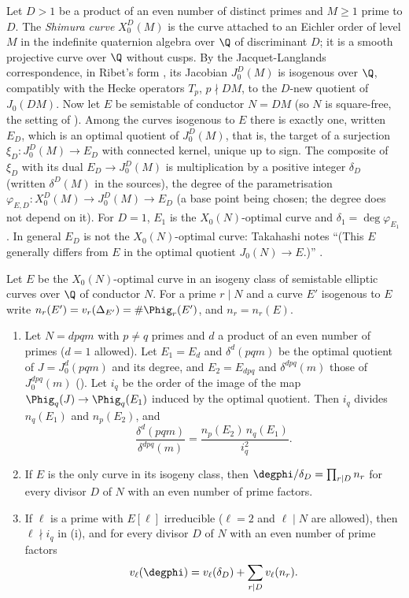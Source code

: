 \begin{definition}\label{def:moddeg:shimura-curve}
Let $D>1$ be a product of an even number of distinct primes and $M\ge1$ prime to $D$. The \emph{Shimura curve} $X_0^D(M)$ is the curve attached to an Eichler order of level $M$ in the indefinite
quaternion algebra over $\Q$ of discriminant $D$; it is a smooth projective curve over $\Q$ without cusps. By the Jacquet-Langlands correspondence, in Ribet's form \cite{Ribet90}, its Jacobian
$J_0^D(M)$ is isogenous over $\Q$, compatibly with the Hecke operators $T_p$, $p\nmid DM$, to the $D$-new quotient of $J_0(DM)$. Now let $E$ be semistable of conductor $N=DM$ (so $N$ is
square-free, the setting of \cite{RibetTakahashi97,Takahashi01}). Among the curves isogenous to $E$ there is exactly one, written $E_D$, which is an optimal quotient of $J_0^D(M)$, that is, the
target of a surjection $\xi_D\colon J_0^D(M)\to E_D$ with connected kernel, unique up to sign. The composite of $\xi_D$ with its dual $E_D\to J_0^D(M)$ is multiplication by a positive
integer $\delta_D$ (written $\delta^D(M)$ in the sources), the degree of the parametrisation $\varphi_{E,D}\colon X_0^D(M)\to J_0^D(M)\to E_D$ (a base point being chosen; the degree does not
depend on it). For $D=1$, $E_1$ is the $X_0(N)$-optimal curve and $\delta_1=\deg\varphi_{E_1}$. In general $E_D$ is not the $X_0(N)$-optimal curve: Takahashi notes ``(This $E$ generally differs
from $E$ in the optimal quotient $J_0(N)\to E$.)'' \cite[p.~75]{Takahashi01}.
\end{definition}

\begin{theorem}\label{thm:moddeg:ribet-takahashi}
Let $E$ be the $X_0(N)$-optimal curve in an isogeny class of semistable elliptic curves over $\Q$ of conductor $N$. For a prime $r\mid N$ and a curve $E'$ isogenous to $E$ write
$n_r(E')=v_r(\Delta_{E'})=\#\Phig_r(E')$, and $n_r=n_r(E)$.
\begin{enumerate}[label=(\roman*)]
\item Let $N=dpqm$ with $p\ne q$ primes and $d$ a product of an even number of primes ($d=1$ allowed). Let $E_1=E_d$ and $\delta^d(pqm)$ be the optimal quotient of $J=J_0^d(pqm)$ and its degree,
and $E_2=E_{dpq}$ and $\delta^{dpq}(m)$ those of $J_0^{dpq}(m)$ (). Let $i_q$ be the order of the image of the map $\Phig_q(J)\to\Phig_q(E_1)$ induced by the optimal
quotient. Then $i_q$ divides $n_q(E_1)$ and $n_p(E_2)$, and
\[
\frac{\delta^d(pqm)}{\delta^{dpq}(m)}=\frac{n_p(E_2)\,n_q(E_1)}{i_q^{2}}.
\]
\item If $E$ is the only curve in its isogeny class, then $\degphi/\delta_D=\prod_{r\mid D}n_r$ for every divisor $D$ of $N$ with an even number of prime factors.
\item If $\ell$ is a prime with $E[\ell]$ irreducible ($\ell=2$ and $\ell\mid N$ are allowed), then $\ell\nmid i_q$ in (i), and for every divisor $D$ of $N$ with an even number of prime factors
\[
v_\ell(\degphi)=v_\ell(\delta_D)+\sum_{r\mid D}v_\ell(n_r).
\]
\end{enumerate}
\end{theorem}

